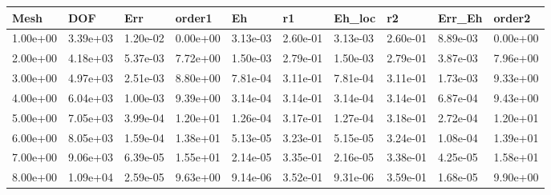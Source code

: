 \begin{tabular}{llllllllll}
Mesh & DOF & Err & order1 & Eh & r1 & Eh_loc & r2 & Err_Eh & order2 \\ 
\hline 
1.00e+00 & 3.39e+03 & 1.20e-02 & 0.00e+00 & 3.13e-03 & 2.60e-01 & 3.13e-03 & 2.60e-01 & 8.89e-03 & 0.00e+00 \\ 
2.00e+00 & 4.18e+03 & 5.37e-03 & 7.72e+00 & 1.50e-03 & 2.79e-01 & 1.50e-03 & 2.79e-01 & 3.87e-03 & 7.96e+00 \\ 
3.00e+00 & 4.97e+03 & 2.51e-03 & 8.80e+00 & 7.81e-04 & 3.11e-01 & 7.81e-04 & 3.11e-01 & 1.73e-03 & 9.33e+00 \\ 
4.00e+00 & 6.04e+03 & 1.00e-03 & 9.39e+00 & 3.14e-04 & 3.14e-01 & 3.14e-04 & 3.14e-01 & 6.87e-04 & 9.43e+00 \\ 
5.00e+00 & 7.05e+03 & 3.99e-04 & 1.20e+01 & 1.26e-04 & 3.17e-01 & 1.27e-04 & 3.18e-01 & 2.72e-04 & 1.20e+01 \\ 
6.00e+00 & 8.05e+03 & 1.59e-04 & 1.38e+01 & 5.13e-05 & 3.23e-01 & 5.15e-05 & 3.24e-01 & 1.08e-04 & 1.39e+01 \\ 
7.00e+00 & 9.06e+03 & 6.39e-05 & 1.55e+01 & 2.14e-05 & 3.35e-01 & 2.16e-05 & 3.38e-01 & 4.25e-05 & 1.58e+01 \\ 
8.00e+00 & 1.09e+04 & 2.59e-05 & 9.63e+00 & 9.14e-06 & 3.52e-01 & 9.31e-06 & 3.59e-01 & 1.68e-05 & 9.90e+00 \\ 
\hline 
\end{tabular}